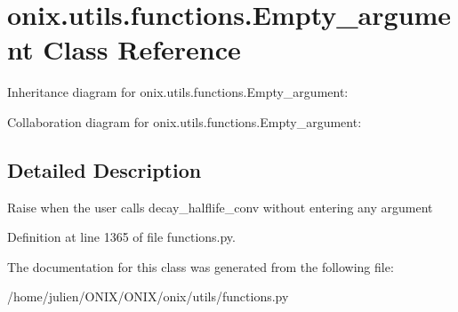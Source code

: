 \hypertarget{classonix_1_1utils_1_1functions_1_1Empty__argument}{}\section{onix.\+utils.\+functions.\+Empty\+\_\+argument Class Reference}
\label{classonix_1_1utils_1_1functions_1_1Empty__argument}


Inheritance diagram for onix.\+utils.\+functions.\+Empty\+\_\+argument\+:


Collaboration diagram for onix.\+utils.\+functions.\+Empty\+\_\+argument\+:


\subsection{Detailed Description}
\begin{DoxyVerb}Raise when the user calls decay_halflife_conv without entering any argument \end{DoxyVerb}
 

Definition at line 1365 of file functions.\+py.



The documentation for this class was generated from the following file\+:\begin{DoxyCompactItemize}
\item 
/home/julien/\+O\+N\+I\+X/\+O\+N\+I\+X/onix/utils/functions.\+py\end{DoxyCompactItemize}
